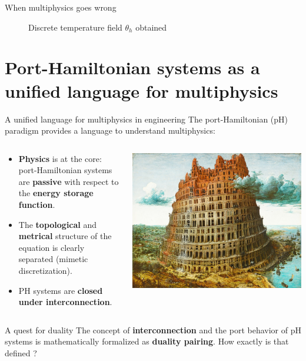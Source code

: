 \documentclass[aspectratio=169]{beamer}
\begin{document}
\begin{frame}{When multiphysics goes wrong}
\begin{figure}[t]
\begin{subfigure}[t]{0.32\textwidth}
	\end{subfigure}
\caption{Discrete temperature field $\theta_h$ obtained }
\end{figure}

\end{frame}

\section{Port-Hamiltonian systems as a unified language for multiphysics}

\begin{frame}{A unified language for multiphysics in engineering}
	The port-Hamiltonian (pH) paradigm provides a language to understand multiphysics:
	\vspace{.3cm}
	\begin{columns}
		\begin{column}{.65\textwidth}
			\begin{itemize}
				\item \textbf{Physics} is at the core: port-Hamiltonian systems are \textbf{passive} with respect to the \textbf{energy storage function}.
				\item The \textbf{topological} and \textbf{metrical} structure of the equation is clearly separated (mimetic discretization).
				\item PH systems are \textbf{closed under interconnection}. 
			\end{itemize}
		\end{column}
		\begin{column}{.35\textwidth}
			\centering
			\includegraphics[width=.9\columnwidth]{babel_tower.jpeg}
		\end{column}
	\end{columns}
\begin{block}{A quest for duality}
	The concept of \textbf{interconnection} and the port behavior of pH systems is mathematically formalized as \textbf{duality pairing}.	 How exactly is that defined ?
\end{block}


\end{frame}
\end{document}
